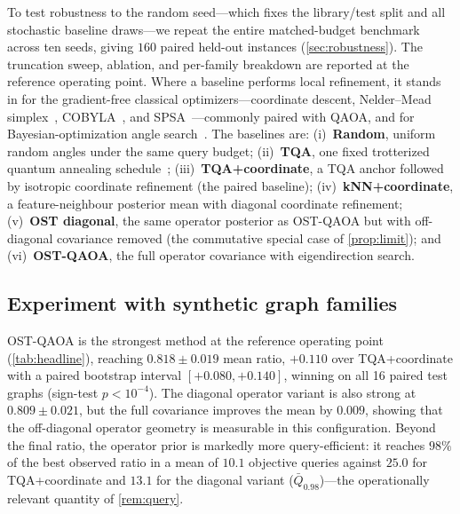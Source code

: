 \documentclass[aps,prxquantum,reprint,amsmath,amssymb,floatfix,nofootinbib,superscriptaddress,longbibliography]{revtex4-2}
\theoremstyle{remark}
\newcommand{\OSTQAOA}{\textnormal{\textsc{OST-QAOA}}}
\newcommand{\TQA}{\textnormal{\textsc{TQA}}}
\begin{document}
To test robustness to the random seed---which fixes the library/test split and
all stochastic baseline draws---we repeat the entire matched-budget benchmark
across ten seeds, giving \(160\) paired held-out instances (\cref{sec:robustness}).
The truncation sweep, ablation, and per-family breakdown are reported at the
reference operating point.  Where a baseline performs local refinement, it stands
in for the gradient-free classical optimizers---coordinate descent, Nelder--Mead
simplex~\cite{neldermead1965}, COBYLA~\cite{powell1994}, and SPSA~\cite{spall1992}---commonly
paired with QAOA, and for Bayesian-optimization angle search~\cite{tibaldi2023}.
The baselines are:
(i)~\textbf{Random}, uniform random angles under the same query budget;
(ii)~\textbf{\TQA{}}, one fixed trotterized quantum annealing
schedule~\cite{sack2021};
(iii)~\textbf{\TQA{}+coordinate}, a \TQA{} anchor followed by isotropic
coordinate refinement (the paired baseline);
(iv)~\textbf{kNN+coordinate}, a feature-neighbour posterior mean with diagonal
coordinate refinement;
(v)~\textbf{OST diagonal}, the same operator posterior as \OSTQAOA{} but with
off-diagonal covariance removed (the commutative special case of
\cref{prop:limit}); and
(vi)~\textbf{\OSTQAOA{}}, the full operator covariance with eigendirection search.

\subsection{Experiment with synthetic graph families}
\label{sec:synthetic}

\OSTQAOA{} is the strongest method at the reference operating point
(\cref{tab:headline}), reaching \(0.818\pm0.019\) mean ratio, \(+0.110\) over
\TQA{}+coordinate with a paired bootstrap interval \([+0.080,+0.140]\), winning on
all 16 paired test graphs (sign-test \(p<10^{-4}\)).  The diagonal operator
variant is also strong at \(0.809\pm0.021\), but the full covariance improves the
mean by \(0.009\), showing that the off-diagonal operator geometry is measurable
in this configuration.  Beyond the final ratio, the operator prior is markedly
more query-efficient: it reaches \(98\%\) of the best observed ratio in a mean of
\(10.1\) objective queries against \(25.0\) for \TQA{}+coordinate and \(13.1\) for
the diagonal variant (\(\bar Q_{0.98}\))---the operationally relevant quantity of
\cref{rem:query}.

\begin{table}[t]
\centering
\caption{Approximation ratio and query cost of the angle-search task with
\OSTQAOA{} and the baselines at the reference operating point (\(p=3\), \(Q=24\),
rank \(4\), seed \(260424803\)).  Values are mean approximation ratio with 95\%
confidence intervals across 16 held-out graphs.  \(\Delta\) is the paired
difference against \TQA{}+coordinate with a bootstrap 95\% interval; \(\bar
Q_{0.98}\) is the mean number of objective queries to reach \(98\%\) of the best
observed ratio (\cref{rem:query}).}
\label{tab:headline}

\end{table}
\end{document}
